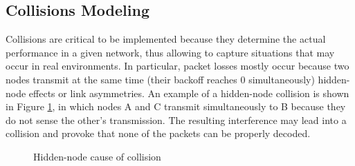 \documentclass[a4paper]{article}
\begin{document}
	\subsection{Collisions Modeling}
	Collisions are critical to be implemented because they determine the actual performance in a given network, thus allowing to capture situations that may occur in real environments. In particular, packet losses mostly occur because two nodes transmit at the same time (their backoff reaches 0 simultaneously) hidden-node effects or link asymmetries. An example of a hidden-node collision is shown in Figure \ref{fig:collisions_hidden_node}, in which nodes A and C transmit simultaneously to B because they do not sense the other's transmission.	The resulting interference may lead into a collision and provoke that none of the packets can be properly decoded.
	\begin{figure}
		\centering
		\caption{Hidden-node cause of collision} \label{fig:collisions_hidden_node}
	\end{figure}
\end{document}
